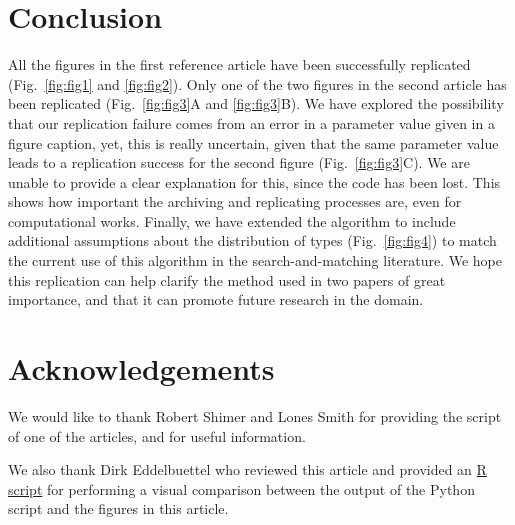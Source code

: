 \section*{Conclusion}
All the figures in the first reference article \citep{shimer_assortative_2000} have been successfully replicated (Fig.~\ref{fig:fig1} and \ref{fig:fig2}). Only one of the two figures in the second article \citep{smith_marriage_2006} has been replicated (Fig.~\ref{fig:fig3}A and \ref{fig:fig3}B). We have explored the possibility that our replication failure comes from an error in a parameter value given in a figure caption, yet, this is really uncertain, given that the same parameter value leads to a replication success for the second figure (Fig.~\ref{fig:fig3}C). We are unable to provide a clear explanation for this, since the code has been lost. This shows how important the archiving and replicating processes are, even for computational works. Finally, we have extended the algorithm to include additional assumptions about the distribution of types (Fig.~\ref{fig:fig4}) to match the current use of this algorithm in the search-and-matching literature. We hope this replication can help clarify the method used in two papers of great importance, and that it can promote future research in the domain.


\section*{Acknowledgements}
We would like to thank Robert Shimer and Lones Smith for providing the script of one of the articles, and for useful information.

We also thank Dirk Eddelbuettel who reviewed this article and provided an {\hypersetup{urlcolor=blue}\href{https://github.com/fgeoffroy/-Re-Assortative-matching-and-search/blob/main/README.md}{R script}} for performing a visual comparison between the output of the Python script and the figures in this article.
